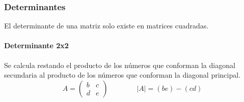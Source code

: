 \documentclass[stu, 12pt, letterpaper, donotrepeattitle, floatsintext, natbib]{apa7}
\begin{document}
    \subsubsection{Determinantes}
    El determinante de una matriz solo existe en matrices cuadradas.

    \paragraph{Determinante 2x2}
    Se calcula restando el producto de los números que conforman la diagonal secundaria al producto de los números que conforman la diagonal principal.
    \[
        A=\begin{pmatrix}
              b & c \\ d & e
        \end{pmatrix}
        \qquad
        \qquad
        |A|= (be) - (cd)
    \]
\end{document}
